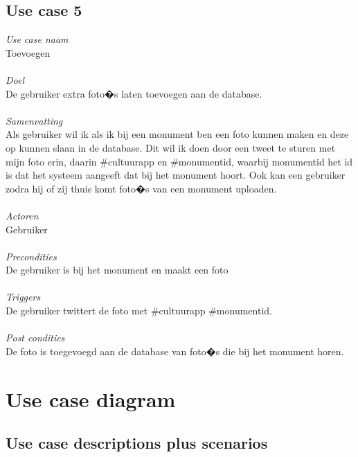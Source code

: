 \documentclass[a4paper,10pt]{article}
\begin{document}
		\subsection{Use case 5}
			\textit{Use case naam}\\
			Toevoegen\\ \\
			\textit{Doel}\\
			De gebruiker extra foto�s laten toevoegen aan de database.\\ \\
			\textit{Samenvatting}\\
			Als gebruiker wil ik als ik bij een monument ben een foto kunnen maken en deze op kunnen slaan in de database. Dit wil ik doen door een tweet te sturen met mijn foto erin, daarin \#cultuurapp en \#monumentid, waarbij monumentid het id is dat het systeem aangeeft dat bij het monument hoort. Ook kan een gebruiker zodra hij of zij thuis komt foto�s van een monument uploaden.\\ \\
			\textit{Actoren}\\
			Gebruiker\\ \\
			\textit{Precondities}\\
			De gebruiker is bij het monument en maakt een foto\\ \\
			\textit{Triggers}\\
			De gebruiker twittert de foto met \#cultuurapp \#monumentid.\\ \\
			\textit{Post condities}\\
			De foto is toegevoegd aan de database van foto�s die bij het monument horen.
			
	\clearpage
	\section{Use case diagram}
		\subsection{Use case descriptions plus scenarios}
\end{document}
